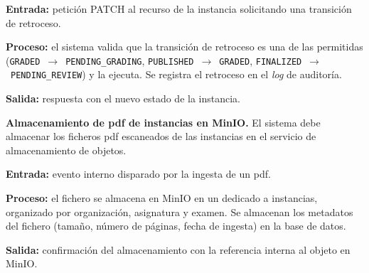\begin{functional}
    \textbf{Entrada:} petición PATCH al recurso de la instancia solicitando una transición
    de retroceso.

    \textbf{Proceso:} el sistema valida que la transición de retroceso es una de las
    permitidas (\texttt{GRADED}~$\rightarrow$~\texttt{PENDING\_GRADING},
    \texttt{PUBLISHED}~$\rightarrow$~\texttt{GRADED},
    \texttt{FINALIZED}~$\rightarrow$~\texttt{PENDING\_REVIEW}) y la ejecuta. Se registra
    el retroceso en el \textit{log} de auditoría.

    \textbf{Salida:} respuesta con el nuevo estado de la instancia.

    \item \textbf{Almacenamiento de \acs{pdf} de instancias en MinIO.}
    \label{rf:instances:storage}
    El sistema debe almacenar los ficheros \acs{pdf} escaneados de las instancias en el
    servicio de almacenamiento de objetos.

    \textbf{Entrada:} evento interno disparado por la ingesta de un \acs{pdf}.

    \textbf{Proceso:} el fichero se almacena en MinIO en un  dedicado a
    instancias, organizado por organización, asignatura y examen. Se almacenan los
    metadatos del fichero (tamaño, número de páginas, fecha de ingesta) en la base de
    datos.

    \textbf{Salida:} confirmación del almacenamiento con la referencia interna al objeto en
    MinIO.

\end{functional}
